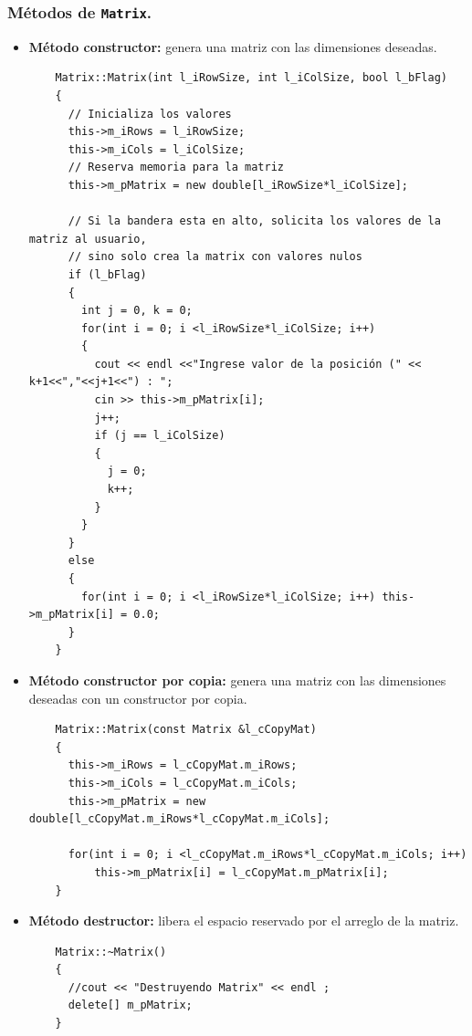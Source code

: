 \subsubsection{Métodos de \texttt{Matrix}.}
\begin{itemize}
    \item \textbf{Método constructor:} genera una matriz con las dimensiones deseadas.
    
    \begin{verbatim}
    Matrix::Matrix(int l_iRowSize, int l_iColSize, bool l_bFlag)
    {
      // Inicializa los valores
      this->m_iRows = l_iRowSize;
      this->m_iCols = l_iColSize;
      // Reserva memoria para la matriz
      this->m_pMatrix = new double[l_iRowSize*l_iColSize];
    
      // Si la bandera esta en alto, solicita los valores de la matriz al usuario,
      // sino solo crea la matrix con valores nulos
      if (l_bFlag)
      {
        int j = 0, k = 0;
        for(int i = 0; i <l_iRowSize*l_iColSize; i++)
        {
          cout << endl <<"Ingrese valor de la posición (" << k+1<<","<<j+1<<") : ";
          cin >> this->m_pMatrix[i];
          j++;
          if (j == l_iColSize)
          {
            j = 0;
            k++;
          }
        }
      }
      else
      {
        for(int i = 0; i <l_iRowSize*l_iColSize; i++) this->m_pMatrix[i] = 0.0;
      }
    }
    \end{verbatim}

    \item \textbf{Método constructor por copia:} genera una matriz con las dimensiones deseadas con un constructor por copia.
    
    \begin{verbatim}
    Matrix::Matrix(const Matrix &l_cCopyMat)
    {
      this->m_iRows = l_cCopyMat.m_iRows;
      this->m_iCols = l_cCopyMat.m_iCols;
      this->m_pMatrix = new double[l_cCopyMat.m_iRows*l_cCopyMat.m_iCols];
    
      for(int i = 0; i <l_cCopyMat.m_iRows*l_cCopyMat.m_iCols; i++)
          this->m_pMatrix[i] = l_cCopyMat.m_pMatrix[i];
    }
    \end{verbatim}
    
    
    \item \textbf{Método destructor:} libera el espacio reservado por el arreglo de la matriz. 
    
    \begin{verbatim}
    Matrix::~Matrix()
    {
      //cout << "Destruyendo Matrix" << endl ;
      delete[] m_pMatrix;
    }
    \end{verbatim}
    

\end{itemize}
